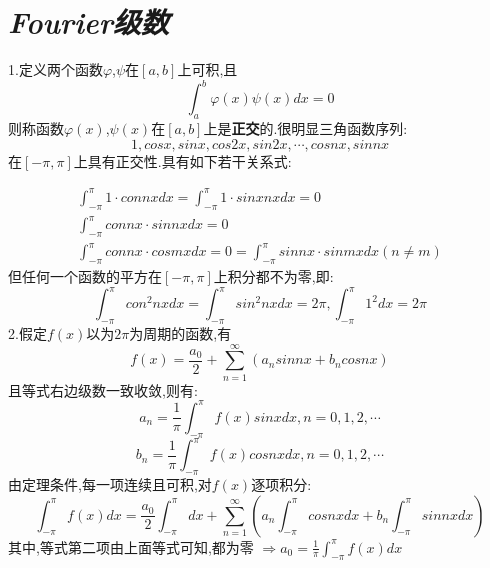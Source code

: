 \documentclass{ctexart}
\begin{document}
\section{\textit{Fourier级数}}
\begin{tcolorbox}[title = {傅里叶级数预备知识},colbacktitle=green!35!black,colback=green!1,arc = 3mm, outer arc = 3mm,fonttitle = \itshape, fontupper = \itshape, fontlower = \itshape]
 1.定义两个函数$\varphi$,$\psi$在$[a,b]$上可积,且$$\int_{a}^{b}\varphi(x)\psi(x)dx=0$$则称函数$\varphi(x)$,$\psi(x)$在$[a,b]$上是{\textbf{正交}}的.很明显三角函数序列:
 $$1,cosx,sinx,cos2x,sin2x,\cdots,cosnx,sinnx$$在$[-\pi,\pi]$上具有正交性.具有如下若干关系式:

    \begin{align}
   \int_{-\pi}^{\pi}1 \cdot connxdx=\int_{-\pi}^{\pi}1 \cdot sinxnxdx=0\\
    \int_{-\pi}^{\pi} connx \cdot sinnxdx=0\\
    \int_{-\pi}^{\pi} connx \cdot cosmxdx=0=\int_{-\pi}^{\pi} sinnx \cdot sinmxdx \left(n \ne m \right) 
    \end{align}
    但任何一个函数的平方在$[-\pi,\pi]$上积分都不为零,即:
    $$\int_{-\pi}^{\pi} con^{2}nxdx=\int_{-\pi}^{\pi} sin^{2}nxdx=2\pi,\int_{-\pi}^{\pi}1^{2}dx=2\pi$$
    \tcblower
    2.假定$f(x)$以为$2\pi$为周期的函数,有$$f(x)=\frac{a_{0}}{2}+\sum_{n=1}^{\infty}\left( a_{n}sinnx+b_{n}cosnx\right) $$且等式右边级数一致收敛,则有:
    $$a_{n}=\frac{1}{\pi}\int_{-\pi}^{\pi}f(x)sinxdx,n=0,1,2,\cdots$$
    $$b_{n}=\frac{1}{\pi}\int_{-\pi}^{\pi}f(x)cosnxdx,n=0,1,2,\cdots$$
    由定理条件,每一项连续且可积,对$f(x)$逐项积分:
    $$\int_{-\pi}^{\pi}f(x)dx=\frac{a_{0}}{2}\int_{-\pi}^{\pi}dx+\sum_{n=1}^{\infty}\left(a_{n}\int_{-\pi}^{\pi}cosnxdx+b_{n}\int_{-\pi}^{\pi}sinnxdx \right) $$
    其中,等式第二项由上面等式可知,都为零	$\displaystyle{\Rightarrow a_{0}=\frac{1}{\pi}\int_{-\pi}^{\pi}f(x)dx}$
	\end{tcolorbox}
\end{document}
